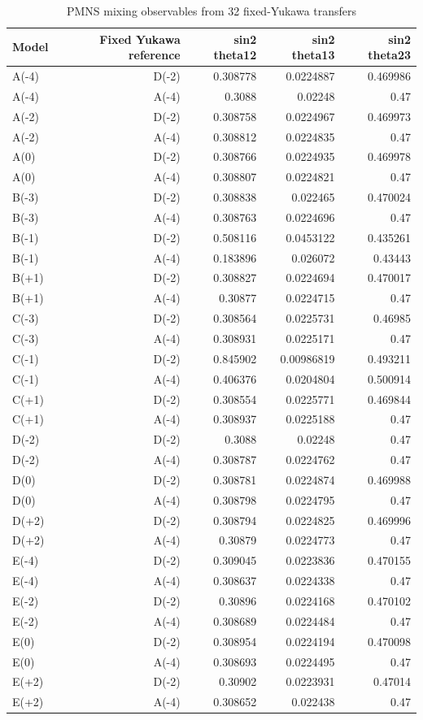 \begin{table}[htbp]
\centering
\small
\caption{PMNS mixing observables from 32 fixed-Yukawa transfers}
\label{tab:table_C3_PMNS}
\begin{tabular}{lrrrr}
\hline
Model & Fixed Yukawa reference & sin2 theta12 & sin2 theta13 & sin2 theta23 \\
\hline
A(-4) & D(-2) & 0.308778 & 0.0224887 & 0.469986 \\
A(-4) & A(-4) & 0.3088 & 0.02248 & 0.47 \\
A(-2) & D(-2) & 0.308758 & 0.0224967 & 0.469973 \\
A(-2) & A(-4) & 0.308812 & 0.0224835 & 0.47 \\
A(0) & D(-2) & 0.308766 & 0.0224935 & 0.469978 \\
A(0) & A(-4) & 0.308807 & 0.0224821 & 0.47 \\
B(-3) & D(-2) & 0.308838 & 0.022465 & 0.470024 \\
B(-3) & A(-4) & 0.308763 & 0.0224696 & 0.47 \\
B(-1) & D(-2) & 0.508116 & 0.0453122 & 0.435261 \\
B(-1) & A(-4) & 0.183896 & 0.026072 & 0.43443 \\
B(+1) & D(-2) & 0.308827 & 0.0224694 & 0.470017 \\
B(+1) & A(-4) & 0.30877 & 0.0224715 & 0.47 \\
C(-3) & D(-2) & 0.308564 & 0.0225731 & 0.46985 \\
C(-3) & A(-4) & 0.308931 & 0.0225171 & 0.47 \\
C(-1) & D(-2) & 0.845902 & 0.00986819 & 0.493211 \\
C(-1) & A(-4) & 0.406376 & 0.0204804 & 0.500914 \\
C(+1) & D(-2) & 0.308554 & 0.0225771 & 0.469844 \\
C(+1) & A(-4) & 0.308937 & 0.0225188 & 0.47 \\
D(-2) & D(-2) & 0.3088 & 0.02248 & 0.47 \\
D(-2) & A(-4) & 0.308787 & 0.0224762 & 0.47 \\
D(0) & D(-2) & 0.308781 & 0.0224874 & 0.469988 \\
D(0) & A(-4) & 0.308798 & 0.0224795 & 0.47 \\
D(+2) & D(-2) & 0.308794 & 0.0224825 & 0.469996 \\
D(+2) & A(-4) & 0.30879 & 0.0224773 & 0.47 \\
E(-4) & D(-2) & 0.309045 & 0.0223836 & 0.470155 \\
E(-4) & A(-4) & 0.308637 & 0.0224338 & 0.47 \\
E(-2) & D(-2) & 0.30896 & 0.0224168 & 0.470102 \\
E(-2) & A(-4) & 0.308689 & 0.0224484 & 0.47 \\
E(0) & D(-2) & 0.308954 & 0.0224194 & 0.470098 \\
E(0) & A(-4) & 0.308693 & 0.0224495 & 0.47 \\
E(+2) & D(-2) & 0.30902 & 0.0223931 & 0.47014 \\
E(+2) & A(-4) & 0.308652 & 0.022438 & 0.47 \\
\hline
\end{tabular}
\end{table}
